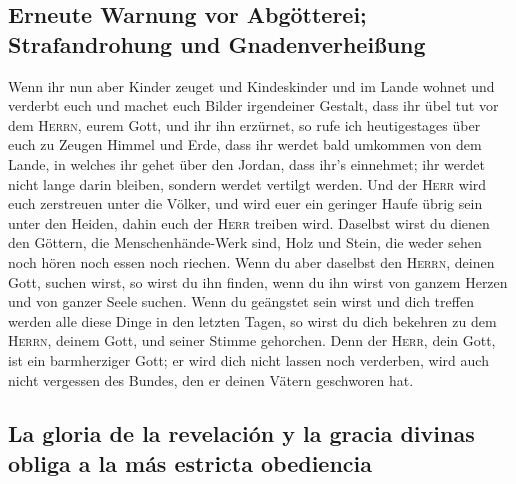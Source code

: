 \hypertarget{erneute-warnung-vor-abguxf6tterei-strafandrohung-und-gnadenverheiuxdfung}{%
\subsection{Erneute Warnung vor Abgötterei; Strafandrohung und
Gnadenverheißung}\label{erneute-warnung-vor-abguxf6tterei-strafandrohung-und-gnadenverheiuxdfung}}

 Wenn ihr nun aber Kinder zeuget und Kindeskinder und im
Lande wohnet und verderbt euch und machet euch Bilder irgendeiner
Gestalt, dass ihr übel tut vor dem \textsc{Herrn}, eurem Gott, und ihr
ihn erzürnet,  so rufe ich heutigestages über euch zu
Zeugen Himmel und Erde, dass ihr werdet bald umkommen von dem Lande, in
welches ihr gehet über den Jordan, dass ihr's einnehmet; ihr werdet
nicht lange darin bleiben, sondern werdet vertilgt werden.
 Und der \textsc{Herr} wird euch zerstreuen unter die
Völker, und wird euer ein geringer Haufe übrig sein unter den Heiden,
dahin euch der \textsc{Herr} treiben wird.  Daselbst
wirst du dienen den Göttern, die Menschenhände-Werk sind, Holz und
Stein, die weder sehen noch hören noch essen noch riechen.
 Wenn du aber daselbst den \textsc{Herrn}, deinen Gott,
suchen wirst, so wirst du ihn finden, wenn du ihn wirst von ganzem
Herzen und von ganzer Seele suchen.  Wenn du geängstet
sein wirst und dich treffen werden alle diese Dinge in den letzten
Tagen, so wirst du dich bekehren zu dem \textsc{Herrn}, deinem Gott, und
seiner Stimme gehorchen.  Denn der \textsc{Herr}, dein
Gott, ist ein barmherziger Gott; er wird dich nicht lassen noch
verderben, wird auch nicht vergessen des Bundes, den er deinen Vätern
geschworen hat.

\hypertarget{la-gloria-de-la-revelaciuxf3n-y-la-gracia-divinas-obliga-a-la-muxe1s-estricta-obediencia}{%
\subsection{La gloria de la revelación y la gracia divinas obliga a la
más estricta
obediencia}\label{la-gloria-de-la-revelaciuxf3n-y-la-gracia-divinas-obliga-a-la-muxe1s-estricta-obediencia}}

